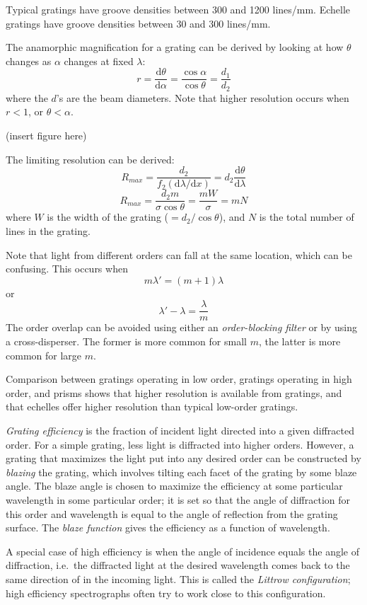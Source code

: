\documentclass[12pt]{article}
\begin{document}
Typical gratings have groove densities between 300 and 1200 lines/mm.
Echelle gratings have groove densities between 30 and 300 lines/mm.

The anamorphic magnification for a grating can be derived by looking
at how $\theta$ changes as $\alpha$ changes at fixed $\lambda$:
\[
    r = \frac{\mathrm{d}\theta}{\mathrm{d}\alpha} =
    \frac{\cos\alpha}{\cos\theta} =
    \frac{d_{1}}{d_{2}}
    \]
where the $d$'s are the beam diameters. Note that higher resolution
occurs when $r < 1$, or $\theta < \alpha$.

(insert figure here)

The limiting resolution can be derived:
\[
    R_{max}
    = \frac{d_{2}}{f_{2}\left(\mathrm{d}\lambda/\mathrm{d}x\right)}
    = d_{2}\frac{\mathrm{d}\theta}{\mathrm{d}\lambda}
    \]
\[
    R_{max}
    = \frac{d_{2}m}{\sigma\cos\theta}
    = \frac{mW}{\sigma}
    = mN
    \]
where $W$ is the width of the grating ($=d_{2}/\cos\theta$), and $N$ is
the total number of lines in the grating.

Note that light from different orders can fall at the same location,
which can be confusing. This occurs when
\[
    m\lambda' = (m + 1)\lambda
    \]
or
\[
    \lambda' - \lambda = \frac{\lambda}{m}
    \]
The order overlap can be avoided using either an \textit{order-blocking filter}
or by using a cross-disperser. The former is more common for small $m$, the
latter is more common for large $m$.

Comparison between gratings operating in low order, gratings operating in high
order, and prisms shows that higher resolution is available from gratings, and
that echelles offer higher resolution than typical low-order gratings.

\textit{Grating efficiency} is the fraction of incident light directed into a
given diffracted order. For a simple grating, less light is diffracted into
higher orders. However, a grating that maximizes the light put into any desired
order can be constructed by \textit{blazing} the grating, which involves
tilting each facet of the grating by some blaze angle. The blaze angle is
chosen to maximize the efficiency at some particular wavelength in some
particular order; it is set so that the angle of diffraction for this order and
wavelength is equal to the angle of reflection from the grating surface. The
\textit{blaze function} gives the efficiency as a function of wavelength.

A special case of high efficiency is when the angle of incidence
equals the angle of diffraction, i.e.\ the diffracted light at the
desired wavelength comes back to the same direction of in the incoming
light. This is called the \textit{Littrow configuration}; high efficiency
spectrographs often try to work close to this configuration.
\end{document}
